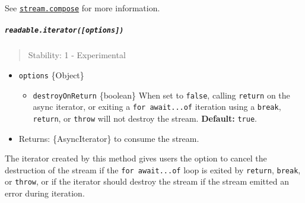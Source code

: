 See \hyperref[streamcomposestreams]{\texttt{stream.compose}} for more
information.

\subparagraph{\texorpdfstring{\texttt{readable.iterator({[}options{]})}}{readable.iterator({[}options{]})}}\label{readable.iteratoroptions}

\begin{quote}
Stability: 1 - Experimental
\end{quote}

\begin{itemize}
\tightlist
\item
  \texttt{options} \{Object\}

  \begin{itemize}
  \tightlist
  \item
    \texttt{destroyOnReturn} \{boolean\} When set to \texttt{false},
    calling \texttt{return} on the async iterator, or exiting a
    \texttt{for\ await...of} iteration using a \texttt{break},
    \texttt{return}, or \texttt{throw} will not destroy the stream.
    \textbf{Default:} \texttt{true}.
  \end{itemize}
\item
  Returns: \{AsyncIterator\} to consume the stream.
\end{itemize}

The iterator created by this method gives users the option to cancel the
destruction of the stream if the \texttt{for\ await...of} loop is exited
by \texttt{return}, \texttt{break}, or \texttt{throw}, or if the
iterator should destroy the stream if the stream emitted an error during
iteration.

